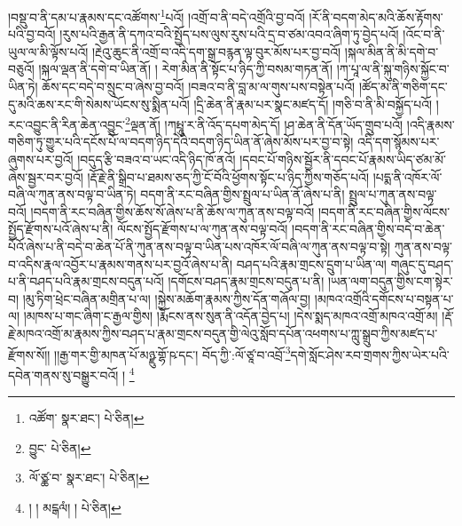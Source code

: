 །བསྡུ་བ་ནི་དམ་པ་རྣམས་དང་འཚོགས་\footnote{འཚོག་  སྣར་ཐང་།  པེ་ཅིན། }པའོ། །འགྲོ་བ་ནི་བདེ་འགྲོའི་བྱ་བའོ། །རོ་ནི་བདག་མེད་མའི་ཆོས་རྟོགས་པའི་བྱ་བའོ། །རུས་པའི་རྒྱན་ནི་དཀའ་བའི་སྤྱོད་པས་ལུས་རུས་པའི་དྲ་བ་ཙམ་འབའ་ཞིག་ཏུ་བྱེད་པའོ། །འོང་བ་ནི་ཡུལ་ལ་མི་ལྟོས་པའོ། །རྔེའུ་ཆུང་ནི་འགྲོ་བ་འདི་དག་སྒྲ་བརྙན་ལྟ་བུར་མོས་པར་བྱ་བའོ། །སྐལ་མིན་ནི་མི་དགེ་བ་བཅུའོ། །སྐལ་ལྡན་ནི་དགེ་བ་ཡིན་ནོ། །
རེག་མིན་ནི་སྟོང་པ་ཉིད་ཀྱི་བསམ་གཏན་ནོ། །ཀ་པཱ་ལ་ནི་སྐུ་གཉིས་སྐྱོང་བ་ཡིན་ཏེ། ཆོས་དང་བདེ་བ་སྲུང་བ་ཞེས་བྱ་བའོ། །བཟའ་བ་ནི་བླ་མ་ལ་གུས་པས་བསྟེན་པའོ། །ཚོད་མ་ནི་གཅིག་དང་དུ་མའི་ཆས་རང་གི་སེམས་ཡོངས་སུ་སྨིན་པའོ། །དྲི་ཆེན་ནི་རྣམ་པར་སྣང་མཛད་དོ། །གཅི་བ་ནི་མི་བསྐྱོད་པའོ། །རང་འབྱུང་ནི་རིན་ཆེན་འབྱུང་\footnote{བྱུང་  པེ་ཅིན། }ལྡན་ནོ། །ཀཔྤཱུ་ར་ནི་འོད་དཔག་མེད་དོ། །ཤ་ཆེན་ནི་དོན་ཡོད་གྲུབ་པའོ། །འདི་རྣམས་གཅིག་ཏུ་གྱུར་པའི་དངོས་པོ་ལ་བདག་ཉིད་དེའི་བདག་ཉིད་ཡིན་ནོ་ཞེས་མོས་པར་བྱ་བ་སྟེ། འདི་དག་སྙོམས་པར་ཞུགས་པར་བྱའོ། །བདུད་རྩི་བཟའ་བ་ཡང་འདི་ཉིད་ཁོ་ནའོ། །དབང་པོ་གཉིས་སྦྱོར་ནི་དབང་པོ་རྣམས་ཡིད་ཙམ་མོ་ཞེས་སྦྱར་བར་བྱའོ། །རྡོ་རྗེ་ནི་སྒྲིབ་པ་ཐམས་ཅད་ཀྱི་ངོ་བོའི་ཕྱོགས་སྟོང་པ་ཉིད་ཀྱིས་གཅོད་པའོ། །པདྨ་ནི་འཁོར་ལོ་བཞི་ལ་ཀུན་ནས་བལྟ་བ་ཡིན་ཏེ། བདག་ནི་རང་བཞིན་གྱིས་སྤྲུལ་པ་ཡིན་ནོ་ཞེས་པ་ནི། སྤྲུལ་པ་ཀུན་ནས་བལྟ་བའོ། །བདག་ནི་རང་བཞིན་གྱིས་ཆོས་སོ་ཞེས་པ་ནི་ཆོས་ལ་ཀུན་ནས་བལྟ་བའོ། །བདག་ནི་རང་བཞིན་གྱིས་ལོངས་སྤྱོད་རྫོགས་པའོ་ཞེས་པ་ནི། ལོངས་སྤྱོད་རྫོགས་པ་ལ་ཀུན་ནས་བལྟ་བའོ། །བདག་ནི་རང་བཞིན་གྱིས་བདེ་བ་ཆེན་པོའོ་ཞེས་པ་ནི་བདེ་བ་ཆེན་པོ་ནི་ཀུན་ནས་བལྟ་བ་ཡིན་པས་འཁོར་ལོ་བཞི་ལ་ཀུན་ནས་བལྟ་བ་སྟེ། ཀུན་ནས་བལྟ་བ་འདིས་རྣལ་འབྱོར་པ་རྣམས་གནས་པར་བྱའོ་ཞེས་པ་ནི། བཤད་པའི་རྣམ་གྲངས་དྲུག་པ་ཡིན་ལ། གཞུང་དུ་བཤད་པ་ནི་བཤད་པའི་རྣམ་གྲངས་བདུན་པའོ། །དགོངས་བཤད་རྣམ་གྲངས་བདུན་པ་ནི། །ཡན་ལག་བདུན་གྱིས་ངག་སྟེར་བ། །མུ་ཏིག་ཕྲེང་བཞིན་མགྲིན་པ་ལ། །སྐྱེས་མཆོག་རྣམས་ཀྱིས་དོན་གཞོལ་བྱ། །མཁའ་འགྲོའི་དགོངས་པ་བསྟན་པ་ལ། །མཁས་པ་གང་ཞིག་ང་རྒྱལ་གྱིས། །རྨོངས་ནས་སུན་ནི་འདོན་བྱེད་པ། །དེས་སྨད་མཁའ་འགྲོ་མཁའ་འགྲོ་མ། །རྡོ་རྗེ་མཁའ་འགྲོ་མ་རྣམས་ཀྱིས་བཤད་པ་རྣམ་གྲངས་བདུན་གྱི་ལེའུ་སློབ་དཔོན་འཕགས་པ་ཀླུ་སྒྲུབ་ཀྱིས་མཛད་པ་རྫོགས་སོ།། །།རྒྱ་གར་གྱི་མཁན་པོ་མཉྫུ་གྷོ་ཥ་དང་། བོད་ཀྱི་:ལོ་ཙཱ་བ་འབྲོ་\footnote{ལོ་ཙྪ་བ་  སྣར་ཐང་།  པེ་ཅིན། }དགེ་སློང་ཤེས་རབ་གྲགས་ཀྱིས་ཡེར་པའི་དབེན་གནས་སུ་བསྒྱུར་བའོ། ། \footnote{། ། མངྒལཾ། །  པེ་ཅིན། }